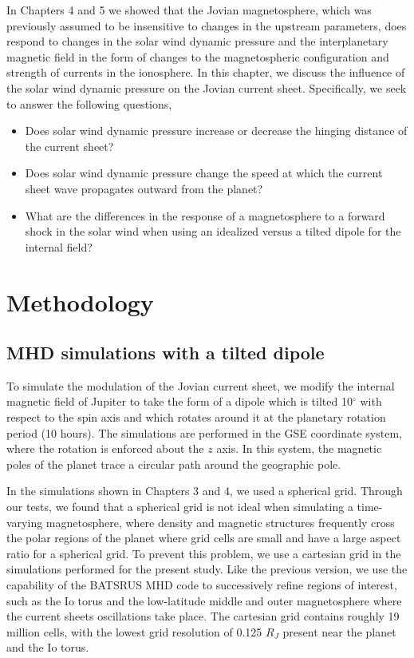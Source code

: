 In Chapters 4 and 5 we showed that the Jovian magnetosphere, which was previously assumed to be insensitive to changes in the upstream parameters, does respond to changes in the solar wind dynamic pressure and the interplanetary magnetic field in the form of changes to the magnetospheric configuration and strength of currents in the ionosphere. In this chapter, we discuss the influence of the solar wind dynamic pressure on the Jovian current sheet. Specifically, we seek to answer the following questions,

\begin{itemize}
    \item Does solar wind dynamic pressure increase or decrease the hinging distance of the current sheet?
    \item Does solar wind dynamic pressure change the speed at which the current sheet wave propagates outward from the planet?
    \item What are the differences in the response of a magnetosphere to a forward shock in the solar wind when using an idealized versus a tilted dipole for the internal field?
\end{itemize}


\section{Methodology}

\subsection{MHD simulations with a tilted dipole}
To simulate the modulation of the Jovian current sheet, we modify the internal magnetic field of Jupiter to take the form of a dipole which is tilted 10$^\circ$ with respect to the spin axis and which rotates around it at the planetary rotation period (10 hours). The simulations are performed in the GSE coordinate system, where the rotation is enforced about the $z$ axis. In this system, the magnetic poles of the planet trace a circular path around the geographic pole. 

In the simulations shown in Chapters 3 and 4, we used a spherical grid. Through our tests, we found that a spherical grid is not ideal when simulating a time-varying magnetosphere, where density and magnetic structures frequently cross the polar regions of the planet where grid cells are small and have a large aspect ratio for a spherical grid. To prevent this problem, we use a cartesian grid in the simulations performed for the present study. Like the previous version, we use the capability of the BATSRUS MHD code to successively refine regions of interest, such as the Io torus and the low-latitude middle and outer magnetosphere where the current sheets oscillations take place. The cartesian grid contains roughly 19 million cells, with the lowest grid resolution of 0.125 $R_J$ present near the planet and the Io torus. 

